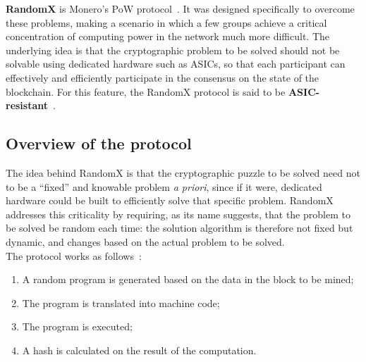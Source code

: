 \documentclass[conference]{IEEEtran}
\begin{document}
\textbf{RandomX} is Monero's PoW protocol~\cite{monero_technical_specs}. It was designed specifically to overcome these problems, making a scenario in which a few groups achieve a critical concentration of computing power in the network much more difficult. The underlying idea is that the cryptographic problem to be solved should not be solvable using dedicated hardware such as ASICs, so that each participant can effectively and efficiently participate in the consensus on the state of the blockchain. For this feature, the RandomX protocol is said to be \textbf{ASIC-resistant}~\cite{randomx_design}.

\subsection{Overview of the protocol}
The idea behind RandomX is that the cryptographic puzzle to be solved need not to be a ``fixed'' and knowable problem \textit{a priori}, since if it were, dedicated hardware could be built to efficiently solve that specific problem. RandomX addresses this criticality by requiring, as its name suggests, that the problem to be solved be random each time: the solution algorithm is therefore not fixed but dynamic, and changes based on the actual problem to be solved.\\
The protocol works as follows~\cite{randomx_design}:
\begin{enumerate}
    \item A random program is generated based on the data in the block to be mined;
    \item The program is translated into machine code;
    \item The program is executed;
    \item A hash is calculated on the result of the computation.
\end{enumerate}
\end{document}
